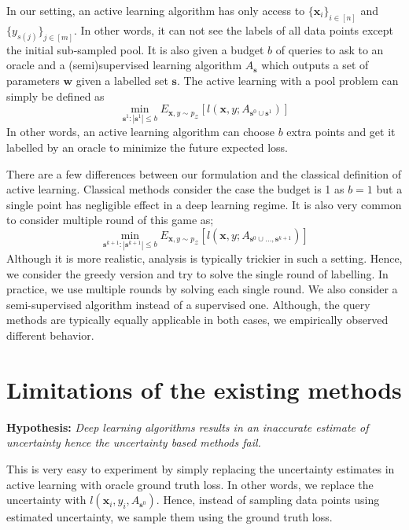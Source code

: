 \documentclass{article}
\begin{document}
In our setting, an active learning algorithm has only access to $\{\mathbf{x}_i\}_{i \in [n]}$ and $\{y_{s(j)}\}_{j \in [m] }$. In other words, it can not see the labels of all data points except the initial sub-sampled pool. It is also given a budget $b$ of queries to ask to an oracle and a (semi)supervised learning algorithm $A_{\mathbf{s}}$ which outputs a set of parameters $\mathbf{w}$ given a labelled set $\mathbf{s}$. The active learning with a pool problem can simply be defined as
\begin{equation}
\min_{\mathbf{s}^1 : |\mathbf{s}^1| \leq b} E_{\mathbf{x},y \sim p_\mathcal{Z}} [l(\mathbf{x},y; A_{\mathbf{s}^0 \cup \mathbf{s}^1})]
\end{equation}
In other words, an active learning algorithm can choose $b$ extra points and get it labelled by an oracle to minimize the future expected loss.

There are a few differences between our formulation and the classical definition of active learning. Classical methods consider the case the budget is 1 as $b=1$ but a single point has negligible effect in a deep learning regime. It is also very common to consider multiple round of this game as;
\begin{equation}
\min_{\mathbf{s}^{k+1} : |\mathbf{s}^{k+1}| \leq b} E_{\mathbf{x},y \sim p_\mathcal{Z}} [l(\mathbf{x},y; A_{\mathbf{s}^{0} \cup \ldots, \mathbf{s}^{k+1}})]
\end{equation}
Although it is more realistic, analysis is typically trickier in such a setting. Hence, we consider the greedy version and try to solve the single round of labelling. In practice, we use multiple rounds by solving each single round. We also consider a semi-supervised algorithm instead of a supervised one. Although, the query methods are typically equally applicable in both cases, we empirically observed different behavior.

\section{Limitations of the existing methods}
\label{neg_res}
\noindent\textbf{Hypothesis:} \emph{Deep learning algorithms results in an inaccurate estimate of uncertainty hence the uncertainty based methods fail.}

This is very easy to experiment by simply replacing the uncertainty estimates in active learning with oracle ground truth loss. In other words, we replace the uncertainty with $l(\mathbf{x}_i,y_i,A_{\mathbf{s}^0})$. Hence, instead of sampling data points using estimated uncertainty, we sample them using the ground truth loss.
\end{document}

